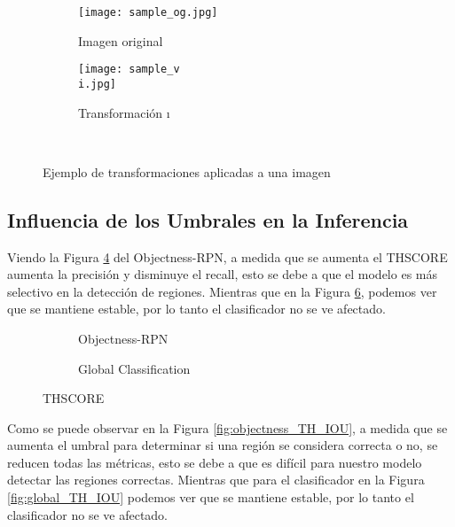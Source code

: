 \begin{figure}[h]
  \centering
  \begin{subfigure}{.3\textwidth}
    \texttt{[image: sample\_og.jpg]}
    \caption{Imagen original}
    \label{fig:sample_og}
  \end{subfigure}
   {
    \begin{subfigure}{.3\textwidth}
      \texttt{[image: sample\_v\\i.jpg]}
      \caption{Transformación \i}
      \label{fig:sample_\i}
    \end{subfigure}
      {\\\medskip}  %
      {}
  }
  \caption{Ejemplo de transformaciones aplicadas a una imagen}
  \label{fig:data_aug}
\end{figure}


\subsection{Influencia de los Umbrales en la Inferencia}
Viendo la Figura \ref{fig:objectness_TH_SCORE} del Objectness-RPN, a medida que se aumenta el TH\textunderscore SCORE aumenta la precisión y disminuye el recall, esto se debe a que el modelo es más selectivo en la detección de regiones. Mientras que en la Figura \ref{fig:global_TH_SCORE}, podemos ver que se mantiene estable, por lo tanto el clasificador no se ve afectado.

\begin{figure}[h]
  \centering
  \begin{subfigure}[t]{.5\textwidth}
    
    \caption{Objectness-RPN}
    \label{fig:objectness_TH_SCORE}
  \end{subfigure}%
  \begin{subfigure}[t]{.5\textwidth}
    
    \caption{Global Classification}
    \label{fig:global_TH_SCORE}
  \end{subfigure}
  \caption{TH\textunderscore SCORE}
\end{figure}

Como se puede observar en la Figura \ref{fig:objectness_TH_IOU}, a medida que se aumenta el umbral para determinar si una región se considera correcta o no, se reducen todas las métricas, esto se debe a que es difícil para nuestro modelo detectar las regiones correctas. Mientras que para el clasificador en la Figura \ref{fig:global_TH_IOU} podemos ver que se mantiene estable, por lo tanto el clasificador no se ve afectado.

